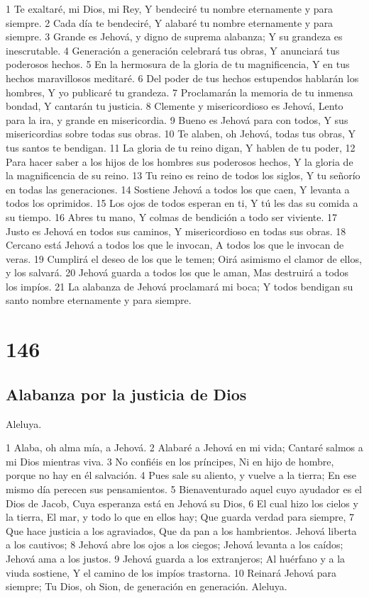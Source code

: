 1 Te exaltaré, mi Dios, mi Rey,
Y bendeciré tu nombre eternamente y para siempre.
2 Cada día te bendeciré,
Y alabaré tu nombre eternamente y para siempre.
3 Grande es Jehová, y digno de suprema alabanza;
Y su grandeza es inescrutable.
4 Generación a generación celebrará tus obras,
Y anunciará tus poderosos hechos.
5 En la hermosura de la gloria de tu magnificencia,
Y en tus hechos maravillosos meditaré.
6 Del poder de tus hechos estupendos hablarán los hombres,
Y yo publicaré tu grandeza.
7 Proclamarán la memoria de tu inmensa bondad,
Y cantarán tu justicia.
8 Clemente y misericordioso es Jehová,
Lento para la ira, y grande en misericordia.
9 Bueno es Jehová para con todos,
Y sus misericordias sobre todas sus obras.
10 Te alaben, oh Jehová, todas tus obras,
Y tus santos te bendigan.
11 La gloria de tu reino digan,
Y hablen de tu poder,
12 Para hacer saber a los hijos de los hombres sus poderosos hechos,
Y la gloria de la magnificencia de su reino.
13 Tu reino es reino de todos los siglos,
Y tu señorío en todas las generaciones.
14 Sostiene Jehová a todos los que caen,
Y levanta a todos los oprimidos.
15 Los ojos de todos esperan en ti,
Y tú les das su comida a su tiempo.
16 Abres tu mano,
Y colmas de bendición a todo ser viviente.
17 Justo es Jehová en todos sus caminos,
Y misericordioso en todas sus obras.
18 Cercano está Jehová a todos los que le invocan,
A todos los que le invocan de veras.
19 Cumplirá el deseo de los que le temen;
Oirá asimismo el clamor de ellos, y los salvará.
20 Jehová guarda a todos los que le aman,
Mas destruirá a todos los impíos.
21 La alabanza de Jehová proclamará mi boca;
Y todos bendigan su santo nombre eternamente y para siempre.

\chapter{146}

\section*{Alabanza por la justicia de Dios}

Aleluya.

1 Alaba, oh alma mía, a Jehová.
2 Alabaré a Jehová en mi vida;
Cantaré salmos a mi Dios mientras viva.
3 No confiéis en los príncipes,
Ni en hijo de hombre, porque no hay en él salvación.
4 Pues sale su aliento, y vuelve a la tierra;
En ese mismo día perecen sus pensamientos.
5 Bienaventurado aquel cuyo ayudador es el Dios de Jacob,
Cuya esperanza está en Jehová su Dios,
6 El cual hizo los cielos y la tierra,
El mar, y todo lo que en ellos hay;
Que guarda verdad para siempre,
7 Que hace justicia a los agraviados,
Que da pan a los hambrientos.
Jehová liberta a los cautivos;
8 Jehová abre los ojos a los ciegos;
Jehová levanta a los caídos;
Jehová ama a los justos.
9 Jehová guarda a los extranjeros;
Al huérfano y a la viuda sostiene,
Y el camino de los impíos trastorna.
10 Reinará Jehová para siempre;
Tu Dios, oh Sion, de generación en generación.
Aleluya.

